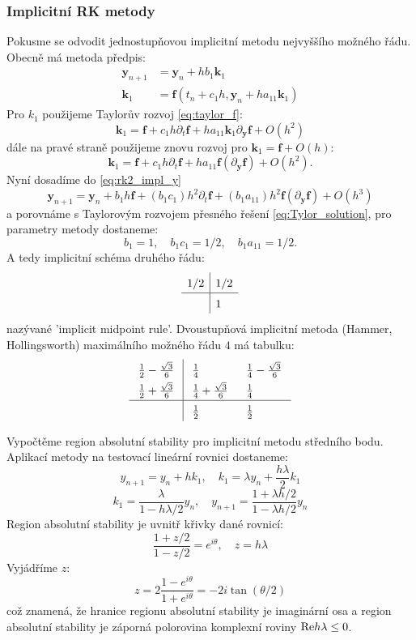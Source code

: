 \documentclass[a4paper, 12pt]{book}
\theoremstyle{definition}
\def\vc#1{\mathbf{\boldsymbol{#1}}}     %
\def\prtl{\partial}                                        %
\begin{document}
\subsubsection{Implicitní RK metody}
Pokusme se odvodit jednostupňovou implicitní metodu nejvyššího možného řádu. Obecně má metoda předpis:
\begin{align}
   \label{eq:rk2_impl_y}
   \vc y_{n+1} &= \vc y_{n} + h b_1 \vc k_1\\
   \vc k_1     &= \vc f (t_n + c_1 h, \vc y_n + ha_{11} \vc k_1 )
\end{align}
Pro $k_1$ použijeme Taylorův rozvoj \eqref{eq:taylor_f}:
\[
 \vc k_1 = \vc f + c_1 h \prtl_t \vc f + h a_{11} \vc k_1 \prtl_{\vc y}\vc f + O(h^2)
\]
dále na pravé straně použijeme znovu rozvoj pro $\vc k_1 = \vc f + O(h)$:
\[
 \vc k_1 = \vc f + c_1 h \prtl_t \vc f + h a_{11} \vc f (\prtl_{\vc y}\vc f) + O(h^2).
\]
Nyní dosadíme do \eqref{eq:rk2_impl_y} 
\[
  \vc y_{n+1} = \vc y_n + b_1 h\vc f + (b_1c_1) h^2\prtl_t \vc f + (b_1a_{11})h^2\vc f(\prtl_{\vc y} \vc f) + O(h^3)
\]
a porovnáme s Taylorovým rozvojem přesného řešení \eqref{eq:Tylor_solution}, 
pro parametry metody dostaneme:
\[
    b_1=1,\quad b_1 c_1 = 1/2,\quad b_1 a_{11} = 1/2.
\]
A tedy implicitní schéma druhého řádu:
\begin{equation}
    \begin{array}{l|l}
        1/2 & 1/2  \\
        \hline
             & 1 \\
    \end{array}
\end{equation}
nazývané 'implicit midpoint rule'. 
Dvoustupňová implicitní metoda (Hammer, Hollingsworth) maximálního možného řádu $4$ má tabulku:
\begin{equation}
    \arraycolsep=8pt\def\arraystretch{1.5}
    \begin{array}{l|ll}
        \frac12 -\frac{\sqrt3}{6} & \frac14 & \frac14-\frac{\sqrt3}{6}  \\
        \frac12 +\frac{\sqrt3}{6} & \frac14+\frac{\sqrt3}{6} & \frac14  \\
        \hline
             & \frac12 & \frac12\\
    \end{array}
\end{equation}

Vypočtěme region absolutní stability pro implicitní metodu středního bodu. Aplikací metody na testovací lineární rovnici dostaneme:
\[
    y_{n+1} = y_n + hk_1,\quad k_1 = \lambda y_n + \frac{h\lambda}{2} k_1
\]
\[
    k_1 = \frac{\lambda }{1 - h\lambda/2} y_n,\quad y_{n+1} = \frac{ 1 + \lambda h/2}{1- \lambda h/2} y_n
\]
Region absolutní stability je uvnitř křivky dané rovnicí:
\[
    \frac{ 1 + z/2}{1- z/2} = e^{i\theta},\quad z = h\lambda
\]
Vyjádříme $z$:
\[
    z = 2\frac{1 - e^{i\theta}}{1 + e^{i\theta}} = -2 i \tan ( \theta/2 )
\]
což znamená, že hranice regionu absolutní stability je imaginární osa a region absolutní stability je záporná polorovina
komplexní roviny $ {\rm Re} h\lambda \le 0 $.
\end{document}
